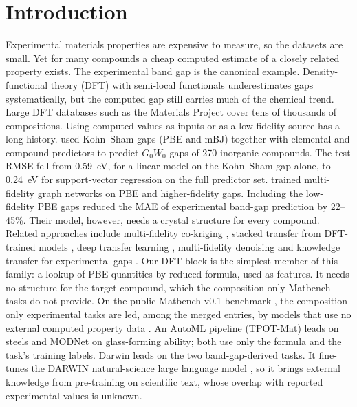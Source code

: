 \section{Introduction}
\label{sec:intro}

Experimental materials properties are expensive to measure, so the datasets are small. Yet for many compounds a cheap computed estimate of a closely related property exists.
The experimental band gap is the canonical example. Density-functional theory (DFT) with semi-local functionals underestimates gaps systematically, but the computed gap still carries much of the chemical trend. Large DFT databases such as the Materials Project \citep{jain2013mp} cover tens of thousands of compositions.
Using computed values as inputs or as a low-fidelity source has a long history.
\citet{lee2016gap} used Kohn--Sham gaps (PBE and mBJ) together with elemental and compound predictors to predict $G_0W_0$ gaps of 270 inorganic compounds. The test RMSE fell from 0.59~eV, for a linear model on the Kohn--Sham gap alone, to 0.24~eV for support-vector regression on the full predictor set.
\citet{chen2021multifidelity} trained multi-fidelity graph networks on PBE and higher-fidelity gaps. Including the low-fidelity PBE gaps reduced the MAE of experimental band-gap prediction by 22--45\%. Their model, however, needs a crystal structure for every compound.
Related approaches include multi-fidelity co-kriging \citep{pilania2017mf}, stacked transfer from DFT-trained models \citep{kauwe2020bandgap}, deep transfer learning \citep{jha2019transfer}, multi-fidelity denoising \citep{liu2022denoise} and knowledge transfer for experimental gaps \citep{ko2024gap}.
Our DFT block is the simplest member of this family: a lookup of PBE quantities by reduced formula, used as features. It needs no structure for the target compound, which the composition-only Matbench tasks do not provide.
On the public Matbench v0.1 benchmark \citep{dunn2020matbench}, the composition-only experimental tasks are led, among the merged entries, by models that use no external computed property data \citep{matbenchboard}. An AutoML pipeline (TPOT-Mat) leads on steels and MODNet \citep{debreuck2021modnet} on glass-forming ability; both use only the formula and the task's training labels. Darwin leads on the two band-gap-derived tasks. It fine-tunes the DARWIN natural-science large language model \citep{xie2023master,xie2023darwin}, so it brings external knowledge from pre-training on scientific text, whose overlap with reported experimental values is unknown.

